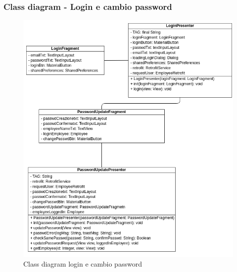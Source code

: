 \subsubsection{Class diagram - Login e cambio password}
\begin{figure}[H]
  \centering
  \includegraphics[scale=0.8]{img/class_diagrams_design/loginNUpdatePassword.png}
  \caption{Class diagram login e cambio password}
\end{figure}
\newpage

